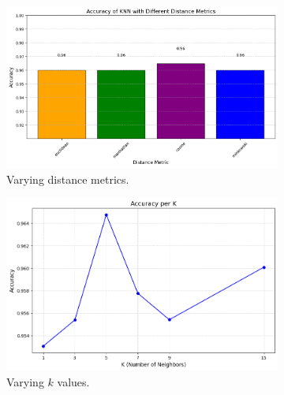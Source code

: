 \documentclass[12pt]{article}
\begin{document}
\begin{figure}[h!]
    \centering
    \begin{subfigure}[b]{0.32\textwidth}
        \centering
        \includegraphics[width=\textwidth]{assets/knn/knn-distance.png}
        \caption{Varying distance metrics.}
        \label{fig:knn_varying_distance}
    \end{subfigure}
    \hfill
    \begin{subfigure}[b]{0.32\textwidth}
        \centering
        \includegraphics[width=\textwidth]{assets/knn/knn-k.png}
        \caption{Varying $k$ values.}
        \label{fig:knn_varying_k}
    \end{subfigure}
    \hfill
    \begin{subfigure}[b]{0.3\textwidth}
        \centering

\end{subfigure}
\end{figure}
\end{document}
